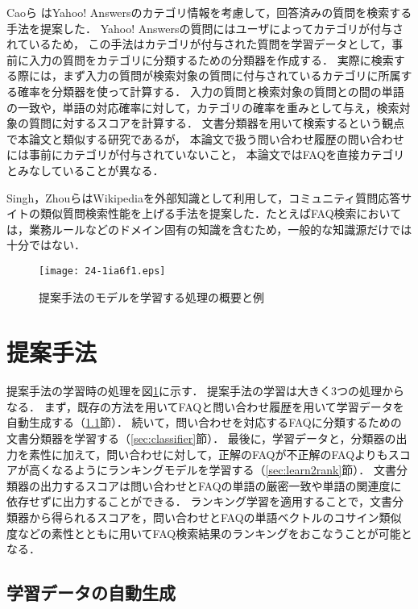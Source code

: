 \documentclass[japanese]{jnlp_1.4}
\begin{document}
Caoら \cite{cao:10,cao:09}はYahoo! Answersのカテゴリ情報を考慮して，回答済みの質問を検索する手法を提案した．
Yahoo! Answersの質問にはユーザによってカテゴリが付与されているため，
この手法はカテゴリが付与された質問を学習データとして，事前に入力の質問をカテゴリに分類するための分類器を作成する．
実際に検索する際には，まず入力の質問が検索対象の質問に付与されているカテゴリに所属する確率を分類器を使って計算する．
入力の質問と検索対象の質問との間の単語の一致や，単語の対応確率に対して，カテゴリの確率を重みとして与え，検索対象の質問に対するスコアを計算する．
文書分類器を用いて検索するという観点で本論文と類似する研究であるが，
本論文で扱う問い合わせ履歴の問い合わせには事前にカテゴリが付与されていないこと，
本論文ではFAQを直接カテゴリとみなしていることが異なる．


Singh\cite{singh:12}，Zhouら\cite{zhou:13}はWikipediaを外部知識として利用して，コミュニティ質問応答サイトの類似質問検索性能を上げる手法を提案した．たとえばFAQ検索においては，業務ルールなどのドメイン固有の知識を含むため，一般的な知識源だけでは十分ではない．

\begin{figure}[b]
\begin{center}
\texttt{[image: 24-1ia6f1.eps]}
\end{center}
\caption{提案手法のモデルを学習する処理の概要と例}
\label{fig:flow}
\end{figure}


\section{提案手法}

提案手法の学習時の処理を図\ref{fig:flow}に示す．
提案手法の学習は大きく3つの処理からなる．
まず，既存の方法を用いてFAQと問い合わせ履歴を用いて学習データを自動生成する（\ref{sec:train-data}節）．
続いて，問い合わせを対応するFAQに分類するための文書分類器を学習する（\ref{sec:classifier}節）．
最後に，学習データと，分類器の出力を素性に加えて，問い合わせに対して，正解のFAQが不正解のFAQよりもスコアが高くなるようにランキングモデルを学習する（\ref{sec:learn2rank}節）．
文書分類器の出力するスコアは問い合わせとFAQの単語の厳密一致や単語の関連度に依存せずに出力することができる．
ランキング学習を適用することで，文書分類器から得られるスコアを，問い合わせとFAQの単語ベクトルのコサイン類似度などの素性とともに用いてFAQ検索結果のランキングをおこなうことが可能となる．


\subsection{学習データの自動生成}
\label{sec:train-data}
\end{document}
